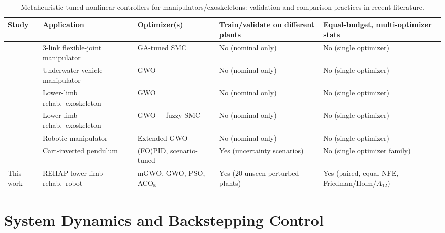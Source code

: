 \documentclass[a4paper,fleqn]{cas-dc}
\newcommand{\mgwo}{mGWO}
\newcommand{\acor}{ACO$_\mathbb{R}$}
\newcommand{\rehap}{REHAP}
\begin{document}
\begin{table}
\caption{Metaheuristic-tuned nonlinear controllers for manipulators/exoskeletons: validation and comparison practices in recent literature.}
\label{tab:sota}
\begin{tabularx}{\textwidth}{@{}l p{3.2cm} p{2.8cm} X X@{}}
\toprule
Study & Application & Optimizer(s) & Train/validate on different plants & Equal-budget, multi-optimizer stats\\
\midrule
\cite{azeez2023} & 3-link flexible-joint manipulator & GA-tuned SMC & No (nominal only) & No (single optimizer)\\
\cite{dai2023} & Underwater vehicle-manipulator & GWO & No (nominal only) & No (single optimizer)\\
\cite{faraj2023} & Lower-limb rehab.\ exoskeleton & GWO & No (nominal only) & No (single optimizer)\\
\cite{zheng2026} & Lower-limb rehab.\ exoskeleton & GWO + fuzzy SMC & No (nominal only) & No (single optimizer)\\
\cite{rezoug2022} & Robotic manipulator & Extended GWO & No (nominal only) & No (single optimizer)\\
\cite{zorlu2026} & Cart-inverted pendulum & (FO)PID, scenario-tuned & Yes (uncertainty scenarios) & No (single optimizer family)\\
This work & \rehap{} lower-limb rehab.\ robot & \mgwo{}, GWO, PSO, \acor{} & Yes (20 unseen perturbed plants) & Yes (paired, equal NFE, Friedman/Holm/$A_{12}$)\\
\bottomrule
\end{tabularx}
\end{table}

\section{System Dynamics and Backstepping Control}\label{sec:model}
\end{document}

